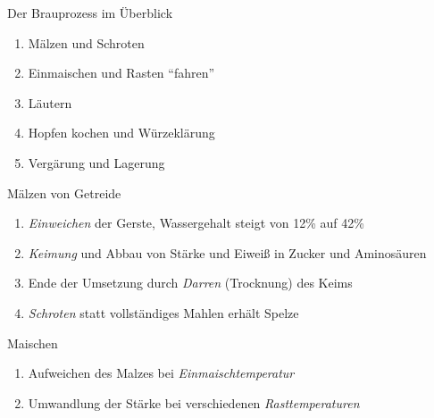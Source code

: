 \documentclass[9pt, ngerman]{beamer}
\begin{document}
\begin{frame}{Der Brauprozess im Überblick}
  \begin{enumerate}
    \item Mälzen und Schroten
    \item Einmaischen und Rasten \enquote{fahren}
    \item Läutern
    \item Hopfen kochen und Würzeklärung
    \item Vergärung und Lagerung
  \end{enumerate}
\end{frame}
{
\begin{frame}{Mälzen von Getreide}
  \begin{enumerate}
    \item \emph{Einweichen} der Gerste, Wassergehalt steigt von 12\% auf 42\%
    \item \emph{Keimung} und Abbau von Stärke und Eiweiß in Zucker und Aminosäuren
    \item Ende der Umsetzung durch \emph{Darren} (Trocknung) des Keims
    \item \emph{Schroten} statt vollständiges Mahlen erhält Spelze
  \end{enumerate}
\end{frame}
}
\begin{frame}{Maischen}
  \begin{enumerate}
    \item Aufweichen des Malzes bei \emph{Einmaischtemperatur}
    \item Umwandlung der Stärke bei verschiedenen \emph{Rasttemperaturen}
  \end{enumerate}
\end{frame}
\end{document}

